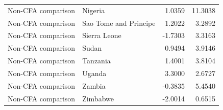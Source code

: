 \begin{table}
\begin{tabular}[t]{llrr}
Non-CFA comparison & Nigeria & 1.0359 & 11.3038\\
Non-CFA comparison & Sao Tome and Principe & 1.2022 & 3.2892\\
Non-CFA comparison & Sierra Leone & -1.7303 & 3.3163\\
\addlinespace
Non-CFA comparison & Sudan & 0.9494 & 3.9146\\
Non-CFA comparison & Tanzania & 1.4001 & 3.8104\\
Non-CFA comparison & Uganda & 3.3000 & 2.6727\\
Non-CFA comparison & Zambia & -0.3835 & 5.4540\\
Non-CFA comparison & Zimbabwe & -2.0014 & 0.6515\\
\bottomrule
\end{tabular}
\end{table}